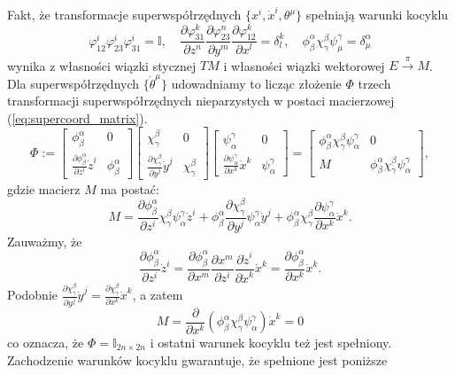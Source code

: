 \documentclass[11pt,a4paper]{report}
\theoremstyle{definition}
\newcommand{\I}{\mathbb{I}}
\begin{document}
Fakt, że transformacje superwspółrzędnych $\{ x^i, \dot{x}^i, \theta^\mu \}$ spełniają warunki kocyklu
\begin{equation*}
 \varphi_{12}^i \varphi_{23}^i \varphi_{31}^i = \I, \quad \frac{\partial \varphi^k_{31}}{\partial z^n} \frac{\partial \varphi^n_{23}}{\partial y^m} \frac{\partial \varphi^k_{12}}{\partial x^l} = \delta^k _l, \quad \phi ^\alpha _\beta \chi ^\beta _\gamma \psi ^\gamma _\mu = \delta ^\alpha _\mu
\end{equation*}
wynika z własności wiązki stycznej $TM$ i własności wiązki wektorowej $E \stackrel{\pi}{\rightarrow} M$. 
Dla superwspółrzędnych $\{ \dot{\theta}^\mu \}$ udowadniamy to licząc złożenie $\Phi$ trzech transformacji superwspółrzędnych nieparzystych w postaci macierzowej (\ref{eq:supercoord_matrix}).
\begin{equation}
\label{eq:supercoord_matrix}
\Phi :=
\left[ \begin{array}{cc}
\phi ^\alpha _\beta & 0 \\
\frac{\partial \phi ^\alpha _\beta}{\partial z^i}\dot z^i & \phi ^\alpha _\beta \end{array} \right]
\left[ \begin{array}{cc}
\chi ^\beta _\gamma & 0 \\
\frac{\partial \chi ^\beta _\gamma}{\partial y^j}\dot y^j & \chi ^\beta _\gamma \end{array} \right]
\left[ \begin{array}{cc}
\psi ^\gamma _\alpha & 0 \\
\frac{\partial \psi ^\gamma _\alpha}{\partial x^k}\dot x^k & \psi ^\gamma _\alpha \end{array} \right]
=
\left[ \begin{array}{cc}
\phi ^\alpha _\beta \chi ^\beta _\gamma \psi ^\gamma _\alpha & 0 \\
M & \phi ^\alpha _\beta \chi ^\beta _\gamma \psi ^\gamma _\alpha
\end{array} \right]\!,
\end{equation}
gdzie macierz $M$ ma postać:
\begin{equation*}
 M = \frac{\partial \phi ^\alpha _\beta}{\partial z^i} \chi ^\beta _\gamma \psi ^\gamma _\alpha \dot z^i + \phi ^\alpha _\beta \frac{\partial \chi ^\beta _\gamma}{\partial y^j} \psi ^\gamma _\alpha \dot y^j + \phi ^\alpha _\beta \chi ^\beta _\gamma \frac{\partial \psi ^\gamma _\alpha}{\partial x^k}\dot x^k.
\end{equation*}
Zauważmy, że 
$$\frac{\partial \phi ^\alpha _\beta}{\partial z^i}\dot z^i = \frac{\partial \phi ^\alpha _\beta}{\partial x^m} \frac{\partial x^m}{\partial z^i} \frac{\partial \dot z^i}{\partial \dot x^k} \dot x^k = \frac{\partial \phi ^\alpha _\beta}{\partial x^k} \dot x^k.$$
Podobnie $\frac{\partial \chi ^\beta _\gamma}{\partial y^j}\dot y^j = \frac{\partial \chi ^\beta _\gamma}{\partial x^k}\dot x^k$, a zatem 
\begin{equation*}
 M = \frac{\partial}{\partial x^k} \left( \phi ^\alpha _\beta \chi ^\beta _\gamma \psi ^\gamma _\alpha \right) \dot x^k = 0
\end{equation*}
co oznacza, że $\Phi = \I_{2n\times 2n}$ i ostatni warunek kocyklu też jest spełniony. Zachodzenie warunków kocyklu gwarantuje, że spełnione jest poniższe
\end{document}
